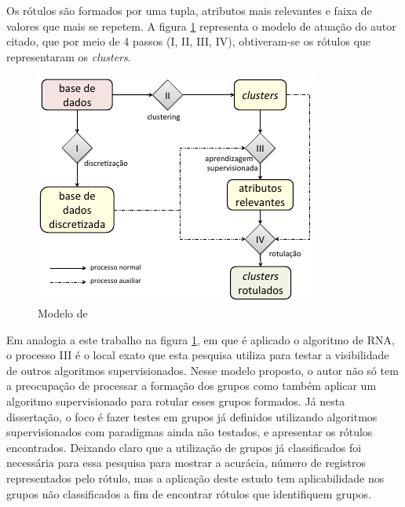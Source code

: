 Os rótulos são formados por uma tupla, atributos mais relevantes e faixa de valores que mais se repetem. A figura \ref{fig:modeloLOPES} representa o modelo de atuação do autor citado, que por meio de 4 passos (I, II, III, IV),  obtiveram-se os rótulos que representaram os \textit{clusters}. 
\begin{figure}[h]
        \centering
        \includegraphics[scale=1]{figs/modeloLopes.png}
        \caption{Modelo de \cite{Lopes2016}} 
        \label{fig:modeloLOPES}
\end{figure}

Em analogia a este trabalho na figura \ref{fig:modeloLOPES}, em que é aplicado o algoritmo de RNA, o processo III é o local exato que esta pesquisa utiliza para testar a visibilidade de outros algoritmos supervisionados. Nesse modelo proposto, o autor não só tem a preocupação de processar a formação dos grupos como também aplicar um algoritmo supervisionado para rotular esses grupos formados. Já nesta dissertação, o foco é fazer testes em grupos já definidos utilizando algoritmos supervisionados com paradigmas  ainda não testados, e apresentar os rótulos encontrados. Deixando claro que a utilização de grupos já classificados foi necessária para essa pesquisa para mostrar a acurácia, número de registros representados pelo rótulo, mas a aplicação deste estudo tem aplicabilidade nos grupos não classificados a fim de encontrar rótulos que identifiquem  grupos.



